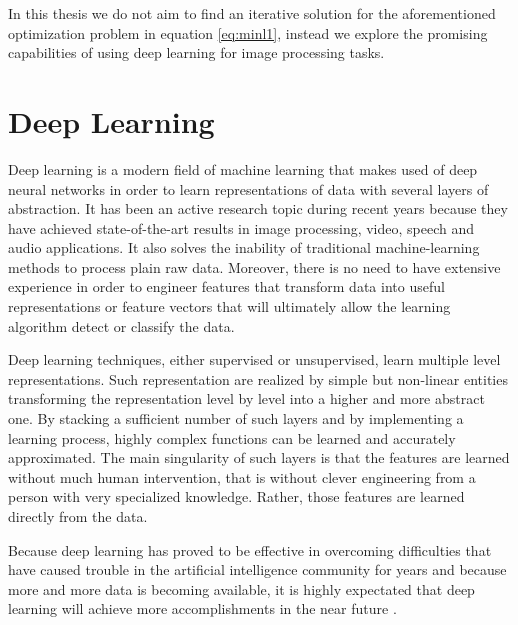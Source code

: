 In this thesis we do not aim to find an iterative solution for the aforementioned optimization problem in equation \ref{eq:minl1}, instead we explore the promising capabilities of using deep learning for image processing tasks.

\FloatBarrier

\section{Deep Learning}
Deep learning is a modern field of machine learning that makes used of deep neural networks in order to learn representations of data with several layers of abstraction. It has been an active research topic during recent years because they have achieved state-of-the-art results in image processing, video, speech and audio applications. It also solves the inability of traditional machine-learning methods to process plain raw data. Moreover, there is no need to have extensive experience in order to engineer features that transform data into useful representations or feature vectors that will ultimately allow the learning algorithm detect or classify the data. \

Deep learning techniques, either supervised or unsupervised, learn multiple level representations. Such representation are realized by simple but non-linear entities transforming the representation level by level into a higher and more abstract one. By stacking a sufficient number of such layers and by implementing a learning process, highly complex functions can be learned and accurately approximated. The main singularity of such layers is that the features are learned without much human intervention, that is without clever engineering from a person with very specialized knowledge. Rather, those features are learned directly from the data.   \   

Because deep learning has proved to be effective in overcoming difficulties that have caused trouble in the artificial intelligence community for years and because more and more data is becoming available, it is highly expectated that deep learning will achieve more accomplishments in the near future \cite{lecun2015deep}. 

\FloatBarrier 


